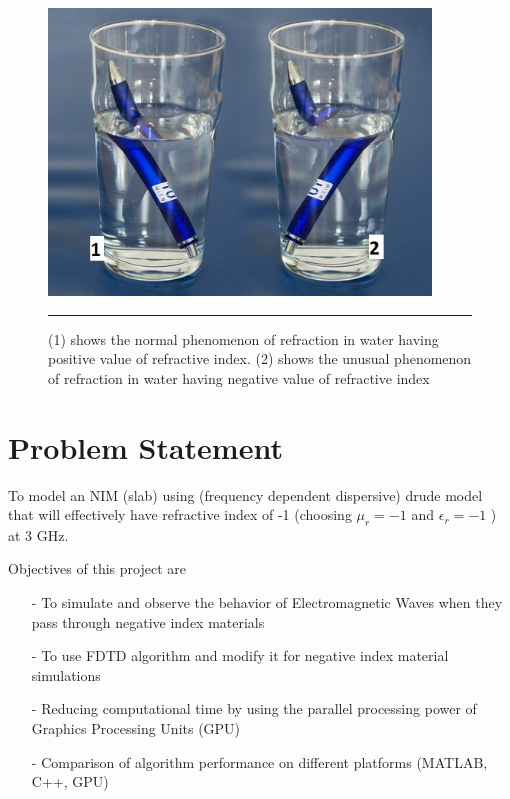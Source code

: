 \begin{figure}[htbp]
	\centering
		\includegraphics[width=4in]{Pictures/glass.jpg}
		\rule{35em}{0.5pt}
	\caption[Illustration of NIM]{(1) shows the normal phenomenon of refraction in water having positive value of refractive index. (2) shows the unusual phenomenon of refraction in water having negative value of refractive index}
	\label{fig:glass}
\end{figure}



\section{Problem Statement}

To model an NIM (slab) using (frequency dependent dispersive) drude model that will effectively have refractive index of -1 (choosing $\mu_{r} = -1$ and $\epsilon_{r} = -1$ ) at 3 GHz.

Objectives of this project are 
\begin{itemize}
\item[-] To simulate and observe the behavior of Electromagnetic Waves when they pass through negative index materials
\item[-] To use FDTD algorithm and modify it for negative index material simulations
\item[-] Reducing computational time by using the parallel processing power of Graphics Processing Units (GPU)
\item[-] Comparison of algorithm performance on different platforms (MATLAB, C++, GPU)
\end{itemize}


